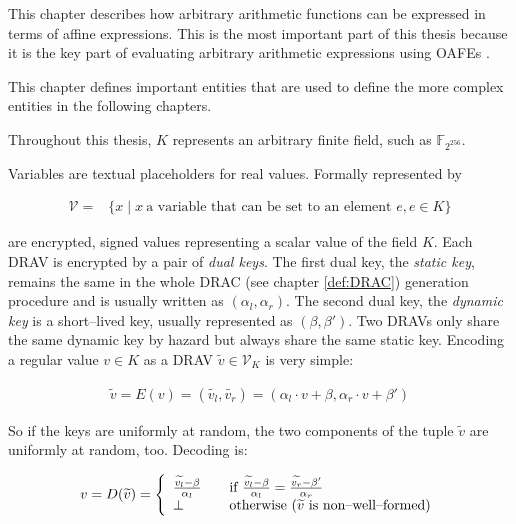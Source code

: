 \label{sec:methods}

This chapter describes how arbitrary arithmetic functions can be expressed in
terms of affine expressions. This is the most important part of this thesis
because it is the key part of evaluating arbitrary arithmetic expressions
using OAFEs \cite{davidgoliath}.


%
%
\label{sec:rae-definitions}

This chapter defines important entities that are used to define the more complex
entities in the following chapters.


\label{def:field} Throughout this thesis, $K$ represents an arbitrary finite
field, such as $\mathbb{F}_{2^{256}}$.



\label{def:variable} Variables are textual placeholders for real values.
Formally represented by

\begin{align*}
  \mathcal{V} = & \{ x \mid x~\text{a variable that can be set to an element
  $e$}, e \in K \}
\end{align*}


%
%
\label{sec:drav}

 are encrypted, signed values
representing a scalar value of the field $K$. Each DRAV is encrypted by a pair
of \emph{dual keys}. The first dual key, the \emph{static key}, remains the same
in the whole DRAC (see chapter \ref{def:DRAC}) generation procedure and is
usually written as $(\alpha_l, \alpha_r)$. The second dual key, the
\emph{dynamic key} is a short--lived key, usually represented as $(\beta,
\beta')$. Two DRAVs only share the same dynamic key by hazard but always share
the same static key. Encoding a regular value $v \in K$ as a DRAV
$\widetilde{v} \in \mathcal{V}_K$ is very simple:

\begin{align*}
  \widetilde{v} = E(v) = (\widetilde{v_l}, \widetilde{v_r}) =
    (\alpha_l \cdot v + \beta, \alpha_r \cdot v + \beta')
\end{align*}

So if the keys are uniformly at random, the two components of the tuple
$\widetilde{v}$ are uniformly at random, too. Decoding is:

\begin{align*}
  v = D(\widetilde{v}) =
  \left\{
    \begin{array}{l l}
      \frac{\widetilde{v_l} - \beta}{\alpha_l} & \quad
      \text{if}~\frac{\widetilde{v_l} - \beta}{\alpha_l} =
      \frac{\widetilde{v_r} - \beta'}{\alpha_r}\\
      \bot & \quad \text{otherwise ($\widetilde{v}$ is non--well--formed)}\\
    \end{array}\right.
\end{align*}

